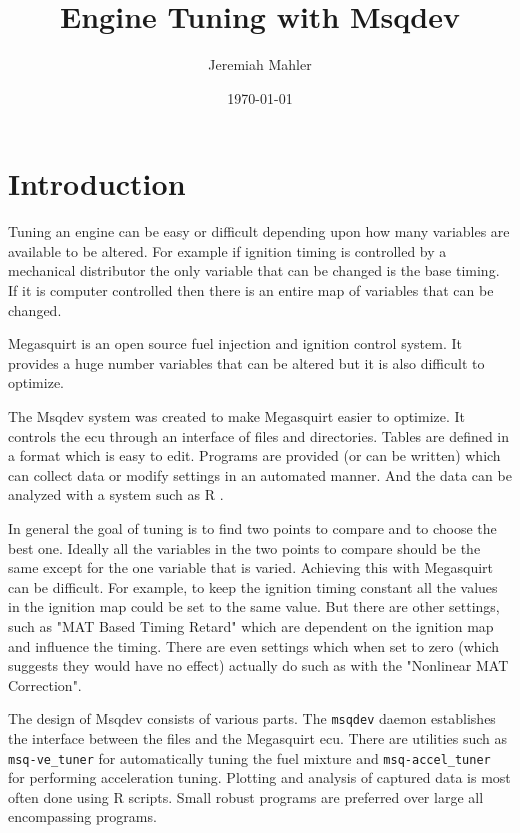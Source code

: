 \documentclass{article}
\begin{document}
\setlength{\parindent}{1cm}

\title{Engine Tuning with Msqdev}
\author{Jeremiah Mahler}
\date{\today}

\maketitle

\tableofcontents

\pagebreak

\section{Introduction}

Tuning an engine can be easy or difficult depending upon
how many variables are available to be altered.
For example if ignition timing is controlled by a mechanical
distributor the only variable that can be changed is the base timing.
If it is computer controlled then there is an entire map
of variables that can be changed.

Megasquirt \cite{MEGA11} is an open source fuel injection and ignition
control system.
It provides a huge number variables that can be altered but
it is also difficult to optimize.

The Msqdev system \cite{MAHL11} was created to make
Megasquirt easier to optimize.
It controls the ecu through an interface of files and directories.
Tables are defined in a format which is easy to edit.
Programs are provided (or can be written) which can
collect data or modify settings in an automated manner.
And the data can be analyzed with a system such as R \cite{R}.

In general the goal of tuning is to find two points to compare
and to choose the best one.
Ideally all the variables in the two points to compare should be
the same except for the one variable that is varied.
Achieving this with Megasquirt can be difficult.
For example, to keep the ignition timing constant all the values in
the ignition map could be set to the same value.
But there are other settings, such as "MAT Based Timing Retard"
which are dependent on the ignition map and influence the timing.
There are even settings which when set to zero (which suggests they
would have no effect) actually do such as with the "Nonlinear MAT Correction".

The design of Msqdev consists of various parts.
The \verb+msqdev+ daemon establishes the interface between the files and the
Megasquirt ecu.
There are utilities such as \verb+msq-ve_tuner+ for automatically
tuning the fuel mixture and \verb+msq-accel_tuner+ for performing
acceleration tuning.
Plotting and analysis of captured data is most often done using
R \cite{R} scripts.
Small robust programs are preferred over large all encompassing
programs.
\end{document}
